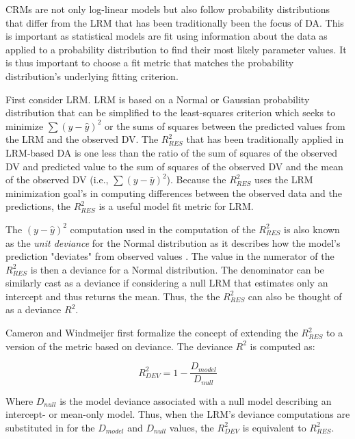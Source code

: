 \documentclass[ShortAfour,times,sageapa]{sagej}
\begin{document}
	CRMs are not only log-linear models but also follow probability distributions that differ from the LRM that has been traditionally been the focus of DA.
	This is important as statistical models are fit using information about the data as applied to a probability distribution to find their most likely parameter values.
	It is thus important to choose a fit metric that matches the probability distribution's underlying fitting criterion.
	
	First consider LRM.
	LRM is based on a Normal or Gaussian probability distribution that can be simplified to the	least-squares criterion which seeks to minimize $\sum (y - \hat{y})^2$ or the sums of squares between the predicted values from the LRM and the observed DV.
	The $R^2_{RES}$ that has been traditionally applied in LRM-based DA is one less than the ratio of the sum of squares of the observed DV and predicted value to the sum of squares of the observed DV and the mean of the observed DV (i.e., $\sum (y - \bar{y})^2$).
	Because the $R^2_{RES}$ uses the LRM minimization goal's in computing differences between the observed data and the predictions, the $R^2_{RES}$ is a useful model fit metric for LRM.
	
	The $(y - \hat{y})^2$ computation used in the computation of the $R^2_{RES}$ is also known as the \emph{unit deviance} for the Normal distribution as it describes how the model's prediction "deviates" from observed values \cite{mccullagh2019generalized}.
	The value in the numerator of the $R^2_{RES}$ is then a deviance for a Normal distribution.
	The denominator can be similarly cast as a deviance if considering a null LRM that estimates only an intercept and thus returns the mean.
	Thus, the the $R^2_{RES}$ can also be thought of as a deviance $R^2$.
	
	Cameron and Windmeijer \cite{cameron1996r} first formalize the concept of extending the $R^2_{RES}$ to a version of the metric based on deviance.
	The deviance $R^2$ is computed as:
	
	\begin{equation}
		R^{2}_{DEV} = 1 - \frac{D_{model}}{D_{null}}
	\end{equation}

	Where $D_{null}$ is the model deviance associated with a null model describing an intercept- or mean-only model.
	Thus, when the LRM's deviance computations are substituted in for the $D_{model}$ and $D_{null}$ values, the $R^{2}_{DEV}$ is equivalent to $R^{2}_{RES}$.
	
\end{document}
